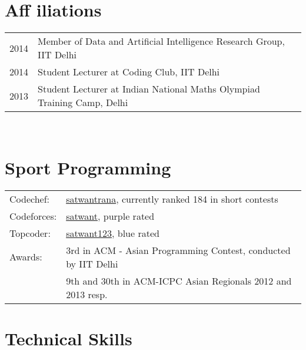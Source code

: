 \documentclass[a4paper,10pt]{article} %
\begin{document}

\section{Aff iliations}
\begin{tabular}{rl}
2014 & Member of Data and Artificial Intelligence Research Group, IIT Delhi \\
2014 & Student Lecturer at Coding Club, IIT Delhi\\
2013 & Student Lecturer at Indian National Maths Olympiad Training Camp, Delhi\\
\end{tabular}\\




\section{Sport Programming}

\begin{tabular}{ll}
Codechef: & \href{http://www.codechef.com/users/satwantrana}{satwantrana}, currently ranked 184 in short contests\\
Codeforces: & \href{http://codeforces.com/profile/satwant}{satwant}, purple rated\\
Topcoder: & \href{http://community.topcoder.com/tc?module=MemberProfile&cr=23152984}{satwant123}, blue rated\\
Awards: & 3rd in ACM - Asian Programming Contest, conducted by IIT Delhi\\
& 9th and 30th in ACM-ICPC Asian Regionals 2012 and 2013 resp.

\end{tabular}



\section{Technical Skills}
\end{document}
